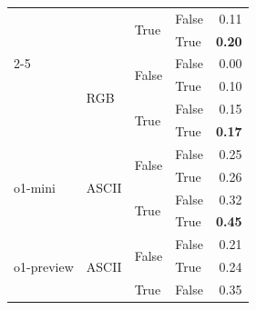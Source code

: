 \documentclass{article}
\begin{document}
\begin{table}
\begin{center}
{\begin{tabular}{@{}llllr@{}}
                                                                        &                           & \multirow[c]{2}{*}{True}  & False                     & 0.11 \\
                                                                        &                           &                           & True                      & \textbf{0.20} \\
    \cmidrule{2-5}
                                                                        & \multirow[c]{4}{*}{RGB}   & \multirow[c]{2}{*}{False} & False                     & 0.00 \\
                                                                        &                           &                           & True                      & 0.10 \\
                                                                        &                           & \multirow[c]{2}{*}{True}  & False                     & 0.15 \\
                                                                        &                           &                           & True                      & \textbf{0.17} \\
    \midrule
    \multirow[c]{4}{*}{o1-mini}                                         & \multirow[c]{4}{*}{ASCII} & \multirow[c]{2}{*}{False} & False                     & 0.25 \\
                                                                        &                           &                           & True                      & 0.26 \\
                                                                        &                           & \multirow[c]{2}{*}{True}  & False                     & 0.32 \\
                                                                        &                           &                           & True                      & \textbf{0.45} \\
    \midrule
    \multirow[c]{4}{*}{o1-preview}                                      & \multirow[c]{4}{*}{ASCII} & \multirow[c]{2}{*}{False} & False                     & 0.21 \\
                                                                        &                           &                           & True                      & 0.24 \\
                                                                        &                           & \multirow[c]{2}{*}{True}  & False                     & 0.35 \\

\end{tabular}}
\end{center}
\end{table}
\end{document}
